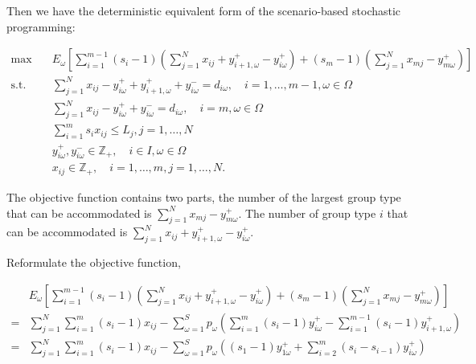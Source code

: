 


Then we have the deterministic equivalent form of the scenario-based stochastic programming:

\begin{equation}\label{sto_form}
    \begin{aligned}
    \max \quad & E_{\omega}\left[\sum_{i=1}^{m-1} (s_i-1) (\sum_{j= 1}^{N} x_{ij} + y_{i+1,\omega}^{+} - y_{i \omega}^{+}) + (s_m-1) (\sum_{j= 1}^{N} x_{mj} - y_{m \omega}^{+})\right] \\
    \text {s.t.} \quad & \sum_{j= 1}^{N} x_{ij}-y_{i \omega}^{+}+
    y_{i+1, \omega}^{+} + y_{i \omega}^{-}=d_{i \omega}, \quad i =1,\ldots,m-1, \omega \in \Omega \\
    & \sum_{j= 1}^{N} x_{ij} -y_{i \omega}^{+}+y_{i \omega}^{-}=d_{i \omega}, \quad i = m, \omega \in \Omega \\
    & \sum_{i=1}^{m} s_{i} x_{ij} \leq L_j, j =1,\ldots, N\\
    & y_{i \omega}^{+}, y_{i \omega}^{-} \in \mathbb{Z}_{+}, \quad i \in I, \omega \in \Omega \\
    & x_{ij} \in \mathbb{Z}_{+}, \quad i=1,\ldots,m, j =1,\ldots,N.
    \end{aligned}
  \end{equation}


The objective function contains two parts, the number of the largest group type that can be accommodated is $\sum_{j= 1}^{N} x_{mj} - y_{m \omega}^{+}$. The number of group type $i$ that can be accommodated is $\sum_{j= 1}^{N} x_{ij} + y_{i+1,\omega}^{+} - y_{i \omega}^{+}$.


Reformulate the objective function,

\begin{align*}
  & E_{\omega}\left[\sum_{i=1}^{m-1} (s_i-1) (\sum_{j= 1}^{N} x_{ij} + y_{i+1,\omega}^{+} - y_{i \omega}^{+}) + (s_m-1) (\sum_{j= 1}^{N} x_{mj} - y_{m \omega}^{+})\right] \\
  =& \sum_{j =1}^{N} \sum_{i=1}^m (s_i-1) x_{ij} - \sum_{\omega =1}^{S} p_{\omega} \left(\sum_{i=1}^{m}(s_i-1)y_{i \omega}^{+} - \sum_{i=1}^{m-1}(s_i-1)y_{i+1, \omega}^{+}\right) \\
  =& \sum_{j =1}^{N} \sum_{i=1}^m (s_i-1) x_{ij} - \sum_{\omega =1}^{S} p_{\omega} \left((s_1-1)y_{1 \omega}^{+} + \sum_{i=2}^{m}(s_{i}-s_{i-1}) y_{i \omega}^{+} \right)
\end{align*}


